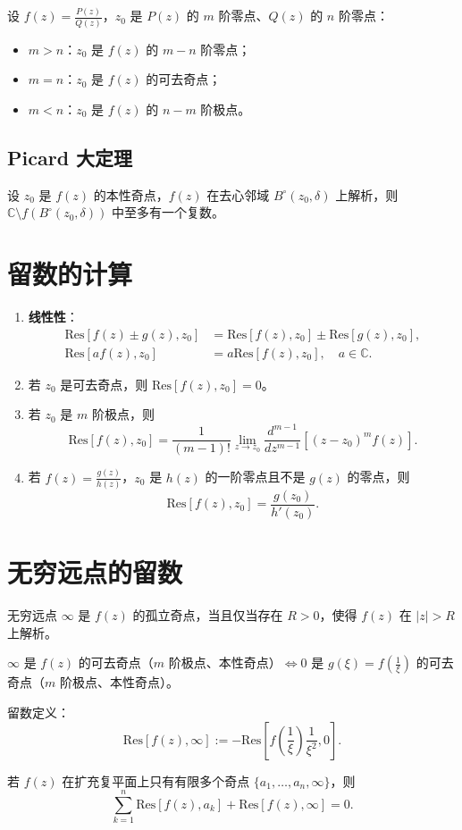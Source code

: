 设 \( f(z) = \frac{P(z)}{Q(z)} \)，\( z_0 \) 是 \( P(z) \) 的 \( m \) 阶零点、\( Q(z) \) 的 \( n \) 阶零点：
\begin{itemize}[leftmargin=2em]
    \item \( m > n \)：\( z_0 \) 是 \( f(z) \) 的 \( m-n \) 阶零点；
    \item \( m = n \)：\( z_0 \) 是 \( f(z) \) 的可去奇点；
    \item \( m < n \)：\( z_0 \) 是 \( f(z) \) 的 \( n-m \) 阶极点。
\end{itemize}

\subsection{Picard 大定理}
设 \( z_0 \) 是 \( f(z) \) 的本性奇点，\( f(z) \) 在去心邻域 \( B^\circ(z_0, \delta) \) 上解析，则 \( \mathbb{C} \setminus f(B^\circ(z_0, \delta)) \) 中至多有一个复数。

\section{留数的计算}
\begin{enumerate}[leftmargin=2em]
    \item \textbf{线性性}：
    \[
    \begin{split}
    \text{Res}\left[f(z) \pm g(z), z_0\right] &= \text{Res}\left[f(z), z_0\right] \pm \text{Res}\left[g(z), z_0\right], \\
    \text{Res}\left[a f(z), z_0\right] &= a \text{Res}\left[f(z), z_0\right], \quad a \in \mathbb{C}.
    \end{split}
    \]
    \item 若 \( z_0 \) 是可去奇点，则 \( \text{Res}\left[f(z), z_0\right] = 0 \)。
    \item 若 \( z_0 \) 是 \( m \) 阶极点，则
    \[
    \text{Res}\left[f(z), z_0\right] = \frac{1}{(m-1)!} \lim_{z \to z_0} \frac{d^{m-1}}{dz^{m-1}} \left[(z - z_0)^m f(z)\right].
    \]
    \item 若 \( f(z) = \frac{g(z)}{h(z)} \)，\( z_0 \) 是 \( h(z) \) 的一阶零点且不是 \( g(z) \) 的零点，则
    \[
    \text{Res}\left[f(z), z_0\right] = \frac{g(z_0)}{h'(z_0)}.
    \]
\end{enumerate}

\section{无穷远点的留数}
无穷远点 \( \infty \) 是 \( f(z) \) 的孤立奇点，当且仅当存在 \( R>0 \)，使得 \( f(z) \) 在 \( |z|>R \) 上解析。

\( \infty \) 是 \( f(z) \) 的可去奇点（\( m \) 阶极点、本性奇点）\( \iff 0 \) 是 \( g(\xi) = f\left( \frac{1}{\xi} \right) \) 的可去奇点（\( m \) 阶极点、本性奇点）。

留数定义：
\[
\text{Res}[f(z), \infty] := -\text{Res}\left[ f\left( \frac{1}{\xi} \right) \frac{1}{\xi^2}, 0 \right].
\]

若 \( f(z) \) 在扩充复平面上只有有限多个奇点 \( \{a_1, \dots, a_n, \infty\} \)，则
\[
\sum_{k=1}^{n} \text{Res}\left[f(z), a_k\right] + \text{Res}\left[f(z), \infty\right] = 0.
\]